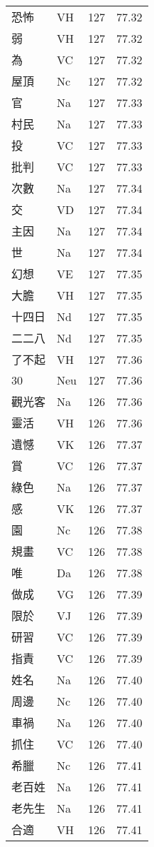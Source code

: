 \documentclass[twocolumn]{book}
\begin{document}
\begin{supertabular}{llrr}
恐怖 & VH & 127 &  77.32\\
弱 & VH & 127 &  77.32\\
為 & VC & 127 &  77.32\\
屋頂 & Nc & 127 &  77.32\\
官 & Na & 127 &  77.33\\
村民 & Na & 127 &  77.33\\
投 & VC & 127 &  77.33\\
批判 & VC & 127 &  77.33\\
次數 & Na & 127 &  77.34\\
交 & VD & 127 &  77.34\\
主因 & Na & 127 &  77.34\\
世 & Na & 127 &  77.34\\
幻想 & VE & 127 &  77.35\\
大膽 & VH & 127 &  77.35\\
十四日 & Nd & 127 &  77.35\\
二二八 & Nd & 127 &  77.35\\
了不起 & VH & 127 &  77.36\\
30 & Neu & 127 &  77.36\\
觀光客 & Na & 126 &  77.36\\
靈活 & VH & 126 &  77.36\\
遺憾 & VK & 126 &  77.37\\
賞 & VC & 126 &  77.37\\
綠色 & Na & 126 &  77.37\\
感 & VK & 126 &  77.37\\
園 & Nc & 126 &  77.38\\
規畫 & VC & 126 &  77.38\\
唯 & Da & 126 &  77.38\\
做成 & VG & 126 &  77.39\\
限於 & VJ & 126 &  77.39\\
研習 & VC & 126 &  77.39\\
指責 & VC & 126 &  77.39\\
姓名 & Na & 126 &  77.40\\
周邊 & Nc & 126 &  77.40\\
車禍 & Na & 126 &  77.40\\
抓住 & VC & 126 &  77.40\\
希臘 & Nc & 126 &  77.41\\
老百姓 & Na & 126 &  77.41\\
老先生 & Na & 126 &  77.41\\
合適 & VH & 126 &  77.41\\

\end{supertabular}
\end{document}
